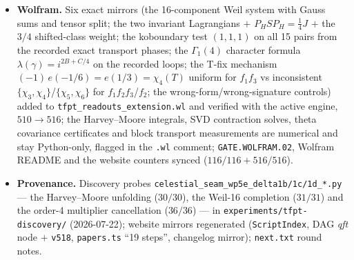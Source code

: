 \begin{itemize}[leftmargin=1.5em]
\texttt{v518\_celestial\_wp5e\_delta1\_derived\_kill.py} is cited via \texttt{veri} in
\texttt{tfpt\_research\_contracts} and \texttt{tfpt\_3}.
\item \textbf{Wolfram.} Six exact mirrors (the 16-component Weil system with Gauss sums and
tensor split; the two invariant Lagrangians $+$ $P_HSP_H=\tfrac14J$ $+$ the $3/4$
shifted-class weight; the koboundary test $(1,1,1)$ on all 15 pairs from the recorded exact
transport phases; the $\Gamma_1(4)$ character formula $\lambda(\gamma)=i^{2B+C/4}$ on the
recorded loops; the T-fix mechanism $(-1)\,e(-1/6)=e(1/3)=\chi_4(T)$ uniform for $f_1f_3$ vs
inconsistent $\{\chi_3,\chi_4\}$/$\{\chi_5,\chi_6\}$ for $f_1f_2f_3$/$f_2$; the
wrong-form/wrong-signature controls) added to \texttt{tfpt\_readouts\_extension.wl} and
verified with the active engine, $510\to516$; the Harvey--Moore integrals, SVD contraction
solves, theta covariance certificates and block transport measurements are numerical and stay
Python-only, flagged in the \texttt{.wl} comment; \texttt{GATE.WOLFRAM.02}, Wolfram README and
the website counters synced ($116/116+516/516$).
\item \textbf{Provenance.} Discovery probes
\texttt{celestial\_seam\_wp5e\_delta1b/1c/1d\_*.py} --- the Harvey--Moore unfolding
($30/30$), the Weil-16 completion ($31/31$) and the order-4 multiplier cancellation
($36/36$) --- in \texttt{experiments/tfpt-discovery/} (2026-07-22); website mirrors
regenerated (\texttt{ScriptIndex}, DAG \emph{qft} node $+$ \texttt{v518},
\texttt{papers.ts} ``19 steps'', changelog mirror); \texttt{next.txt} round notes.
\end{itemize}

